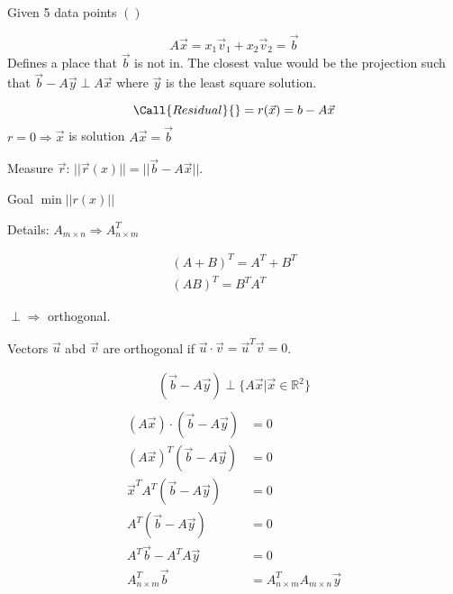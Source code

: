 \documentclass[
	date={October 9{,} 2024},
	month={10},
	day={9}
]{math486notes}
\begin{document}
\tableofcontents
Given 5 data points $()$

\[ A\vec{x} = x_{1}\vec{v}_{1} + x_{2}\vec{v}_{2} = \vec{b} \]
Defines a place that $\vec{b}$ is not in.
The closest value would be the projection such that $\vec{b} - A\vec{y} \perp A\vec{x}$ where $\vec{y}$ is the least square solution.

\begin{equation}
	\Call{Residual}{} = r(\vec{x}) = b - A\vec{x}
	\label{eq:residual}
\end{equation}
$r=0 \Rightarrow \vec{x}$ is solution $A\vec{x}=\vec{b}$

Measure $\vec{r}$: $||\vec{r}(x)|| = ||\vec{b} - A\vec{x}||$.

Goal $\min ||r(x)||$

Details: $A_{m\times n} \Rightarrow A^{T}_{n\times m}$

\begin{gather}
	(A+B)^{T} = A^{T} + B^{T}\label{eq:transpose-addition}\\
	(AB)^{T} = B^{T}A^{T}\label{eq:transpose-multiplication}
\end{gather}

$\perp \Rightarrow$ orthogonal.

Vectors $\vec{u}$ abd $\vec{v}$ are orthogonal if $\vec{u} \cdot \vec{v} = \vec{u}^{T}\vec{v} = 0$.

\begin{equation*}
\begin{aligned}
	(\vec{b} - A\vec{y}) \perp \{ A\vec{x} | \vec{x} \in \mathbb{R}^{2} \}\\
\end{aligned}
\end{equation*}
\begin{equation*}
\begin{aligned}
	(A\vec{x}) \cdot (\vec{b} - A\vec{y}) &= 0\\
	(A\vec{x})^{T}(\vec{b} - A\vec{y}) &= 0\\
	\vec{x}^{T}A^{T}(\vec{b} - A\vec{y}) &= 0\\
	A^{T}(\vec{b} - A\vec{y}) &= 0\\
	A^{T}\vec{b} - A^{T}A\vec{y} &= 0\\
	A^{T}_{n\times m}\vec{b} &= A^{T}_{n\times m}A_{m\times n}\vec{y}\\
\end{aligned}
\end{equation*}
\end{document}
